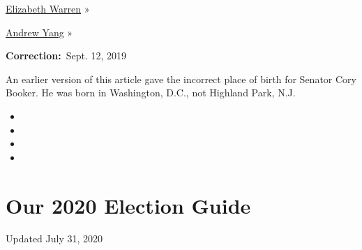 \href{https://www.nytimes.com/interactive/2020/us/elections/elizabeth-warren.html}{Elizabeth
Warren} »

\href{https://www.nytimes.com/interactive/2020/us/elections/andrew-yang.html}{Andrew
Yang} »

\textbf{Correction:}~Sept. 12, 2019

An earlier version of this article gave the incorrect place of birth for
Senator Cory Booker. He was born in Washington, D.C., not Highland Park,
N.J.

\begin{itemize}
\item
\item
\item
\item
\end{itemize}

\hypertarget{our-2020-election-guide}{%
\section{Our 2020 Election Guide}\label{our-2020-election-guide}}

Updated July 31, 2020

